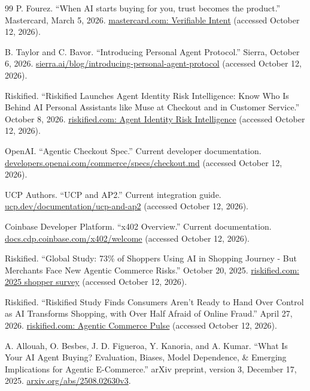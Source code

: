 \documentclass{article}
\begin{document}
\begin{thebibliography}{99}
P. Fourez. ``When AI starts buying for you, trust becomes the product.'' Mastercard, March 5, 2026. \href{https://www.mastercard.com/global/en/news-and-trends/stories/2026/verifiable-intent.html}{mastercard.com: Verifiable Intent} (accessed October 12, 2026).

B. Taylor and C. Bavor. ``Introducing Personal Agent Protocol.'' Sierra, October 6, 2026. \href{https://sierra.ai/blog/introducing-personal-agent-protocol}{sierra.ai/blog/introducing-personal-agent-protocol} (accessed October 12, 2026).

Riskified. ``Riskified Launches Agent Identity Risk Intelligence: Know Who Is Behind AI Personal Assistants like Muse at Checkout and in Customer Service.'' October 8, 2026. \href{https://www.riskified.com/press/agent-identity-risk-intelligence/}{riskified.com: Agent Identity Risk Intelligence} (accessed October 12, 2026).

OpenAI. ``Agentic Checkout Spec.'' Current developer documentation. \href{https://developers.openai.com/commerce/specs/checkout.md}{developers.openai.com/commerce/specs/checkout.md} (accessed October 12, 2026).

UCP Authors. ``UCP and AP2.'' Current integration guide. \href{https://ucp.dev/documentation/ucp-and-ap2/}{ucp.dev/documentation/ucp-and-ap2} (accessed October 12, 2026).

Coinbase Developer Platform. ``x402 Overview.'' Current documentation. \href{https://docs.cdp.coinbase.com/x402/welcome}{docs.cdp.coinbase.com/x402/welcome} (accessed October 12, 2026).

Riskified. ``Global Study: 73\% of Shoppers Using AI in Shopping Journey - But Merchants Face New Agentic Commerce Risks.'' October 20, 2025. \href{https://www.riskified.com/press/global-study-73-of-shoppers-using-ai-in-shopping-journey-but-merchants-face-new-agentic-commerce-risks/}{riskified.com: 2025 shopper survey} (accessed October 12, 2026).

Riskified. ``Riskified Study Finds Consumers Aren't Ready to Hand Over Control as AI Transforms Shopping, with Over Half Afraid of Online Fraud.'' April 27, 2026. \href{https://www.riskified.com/press/riskified-agentic-commerce-pulse/}{riskified.com: Agentic Commerce Pulse} (accessed October 12, 2026).

A. Allouah, O. Besbes, J. D. Figueroa, Y. Kanoria, and A. Kumar. ``What Is Your AI Agent Buying? Evaluation, Biases, Model Dependence, \& Emerging Implications for Agentic E-Commerce.'' arXiv preprint, version 3, December 17, 2025. \href{https://arxiv.org/abs/2508.02630v3}{arxiv.org/abs/2508.02630v3}.


\end{thebibliography}
\end{document}

